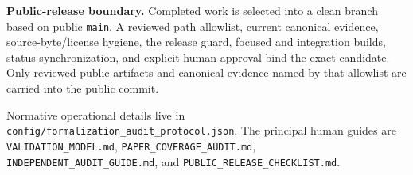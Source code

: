 \documentclass[10pt]{article}
\newcommand{\file}[1]{\texttt{#1}}
\begin{document}
\vspace{7pt}
\colorbox{closefill}{%
  \parbox{\dimexpr\textwidth-2\fboxsep\relax}{%
  \textbf{Public-release boundary.}
  Completed work is selected into a clean branch based on public \file{main}.
  A reviewed path allowlist, current canonical
  evidence, source-byte/license hygiene, the release guard, focused and
  integration builds, status synchronization, and explicit human approval bind
  the exact candidate. Only reviewed public artifacts and canonical evidence
  named by that allowlist are carried into the public commit.}}

\vfill
{\footnotesize\color{releasegray}
Normative operational details live in
\file{config/formalization\_audit\_protocol.json}. The principal human guides
are \file{VALIDATION\_MODEL.md}, \file{PAPER\_COVERAGE\_AUDIT.md},
\file{INDEPENDENT\_AUDIT\_GUIDE.md}, and \file{PUBLIC\_RELEASE\_CHECKLIST.md}.}
\end{document}
